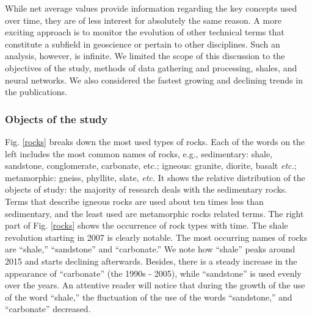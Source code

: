 \documentclass[geosciences,article,submit,moreauthors,pdftex]{Definitions/mdpi}
\begin{document}
While net average values provide information regarding the key concepts used over time, they are of less interest for absolutely the same reason. A more exciting approach is to monitor the evolution of other technical terms that constitute a subfield in geoscience or pertain to other disciplines. Such an analysis, however, is infinite. We limited the scope of this discussion to the objectives of the study, methods of data gathering and processing, shales, and neural networks. We also considered the fastest growing and declining trends in the publications.

\subsubsection{Objects of the study}
Fig. \ref{rocks} breaks down the most used types of rocks. Each of the words on the left includes the most common names of rocks, e.g., sedimentary: shale, sandstone, conglomerate, carbonate, etc.; igneous: granite, diorite, basalt \textit{etc.}; metamorphic: gneiss, phyllite, slate, \textit{etc.} It shows the relative distribution of the objects of study: the majority of research deals with the sedimentary rocks. Terms that describe igneous rocks are used about ten times less than sedimentary, and the least used are metamorphic rocks related terms. The right part of Fig. \ref{rocks} shows the occurrence of rock types with time. The shale revolution starting in 2007 is clearly notable. The most occurring names of rocks are ``shale,'' ``sandstone'' and ``carbonate.'' We note how ``shale'' peaks around 2015 and starts declining afterwards. Besides, there is a steady increase in the appearance of ``carbonate'' (the 1990s - 2005), while ``sandstone'' is used evenly over the years. An attentive reader will notice that during the growth of the use of the word ``shale,'' the fluctuation of the use of the words ``sandstone,'' and ``carbonate'' decreased.
\end{document}
